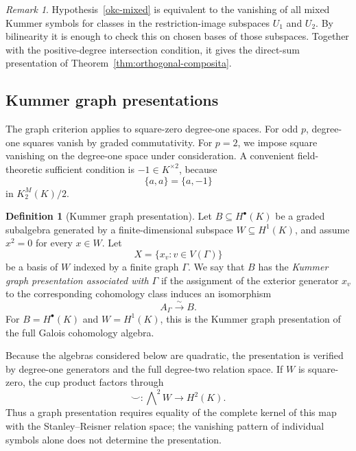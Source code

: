 \documentclass[12pt]{amsart}
\theoremstyle{plain}
\theoremstyle{definition}
\newtheorem{definition}[theorem]{Definition}
\theoremstyle{remark}
\newtheorem{remark}[theorem]{Remark}
\numberwithin{equation}{section}
\begin{document}
\begin{remark}
Hypothesis~\ref{okc-mixed} is equivalent to the vanishing of all mixed
Kummer symbols for classes in the restriction-image subspaces
\(U_1\) and \(U_2\). By bilinearity it is enough to check this on chosen
bases of those subspaces. Together with the positive-degree intersection
condition, it gives the direct-sum presentation of
Theorem~\ref{thm:orthogonal-composita}.
\end{remark}

\subsection{Kummer graph presentations}

The graph criterion applies to square-zero degree-one spaces. For odd \(p\),
degree-one squares vanish by graded commutativity. For \(p=2\), we impose
square vanishing on the degree-one space under consideration. A convenient
field-theoretic sufficient condition is \(-1\in K^{\times2}\), because
\[
\{a,a\}=\{a,-1\}
\]
in \(K_2^M(K)/2\).

\begin{definition}[Kummer graph presentation]
\label{def:kummer-graph}
Let \(B\subseteq H^\bullet(K)\) be a graded subalgebra generated by a
finite-dimensional subspace \(W\subseteq H^1(K)\), and assume
\(x^2=0\) for every \(x\in W\). Let
\[
X=\{x_v:v\in V(\Gamma)\}
\]
be a basis of \(W\) indexed by a finite graph \(\Gamma\). We say that
\(B\) has the \emph{Kummer graph presentation associated with \(\Gamma\)}
if the assignment of the exterior generator \(x_v\) to the corresponding
cohomology class induces an isomorphism
\[
A_\Gamma\overset{\sim}{\longrightarrow}B.
\]
For \(B=H^\bullet(K)\) and \(W=H^1(K)\), this is the Kummer graph
presentation of the full Galois cohomology algebra.
\end{definition}

Because the algebras considered below are quadratic, the presentation is
verified by degree-one generators and the full degree-two relation space. If
\(W\) is square-zero, the cup product factors through
\[
\smile:\bigwedge\nolimits^2 W\longrightarrow H^2(K).
\]
Thus a graph presentation requires equality of the complete kernel of this
map with the Stanley--Reisner relation space; the vanishing pattern of
individual symbols alone does not determine the presentation.
\end{document}
